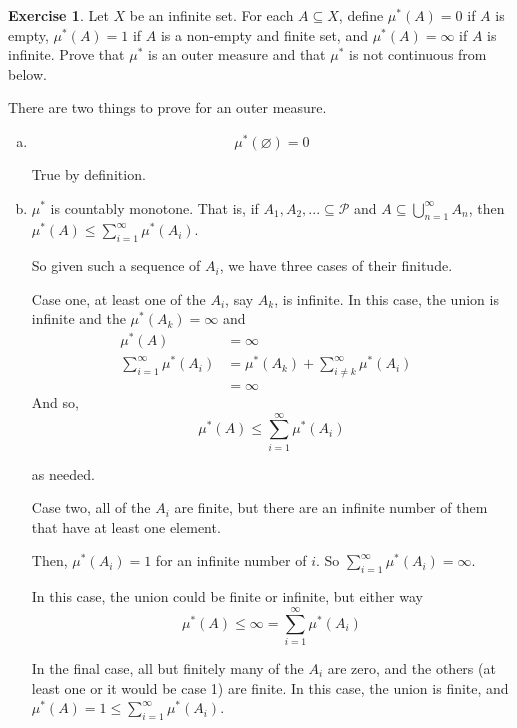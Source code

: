 \documentclass[11pt,oneside]{article}
\numberwithin{equation}{section}
\theoremstyle{definition}
\newtheorem{exercise}{Exercise}
\begin{document}
\begin{exercise}
  Let $X$ be an infinite set.  For each $A \subseteq X$,
  define $\mu^* (A) = 0$ if $A$ is empty, $\mu^*(A) = 1$ if
  $A$ is a non-empty and finite set, and $\mu^*(A) = \infty$
  if $A$ is infinite.  Prove that $\mu^*$ is an
  outer measure and that $\mu^*$ is not continuous from below.
\end{exercise}
\begin{solution}
  There are two things to prove for an outer measure.
  \begin{enumerate}[(a)]
    \item
      $$
      \mu ^ *(\varnothing) = 0
      $$

    True by definition.
    \item
      $      \mu ^ * $ is countably monotone.  That is, if $A_1, A_2, ... \subseteq \mathscr{P}$ and
      $A \subseteq \bigcup \limits _ {n=1} ^ {\infty} A_n$, then
      $\mu ^ * (A) \leq \sum \limits _ {i=1} ^ {\infty} \mu ^* ( A_i)$.

      So given such a sequence of $A_i$, we have three cases of their finitude.

      Case one, at least one of the $A_i$, say $A_k$, is infinite.  In this case,
      the union is infinite and the $\mu ^ * (A_k) = \infty$ and
      \begin{align*}
        \mu ^ * (A) &= \infty  & \\
        \sum \limits _ {i=1} ^ {\infty} \mu ^* ( A_i) &= \mu ^* (A_k) + \sum _{i\neq k} ^ \infty \mu ^*  (A_i) & \\ 
        & = \infty  & 
      \end{align*}
      And so,
      $$
      \mu ^ * (A) \leq   \sum \limits _ {i=1} ^ {\infty} \mu ^* ( A_i)  
      $$

      as needed.

      Case two, all of the $A_i$ are finite, but there are an infinite
      number of them that have at least one element.

      Then, $\mu ^*(A_i) = 1$ for an infinite number of $i$.  So
      $   \sum \limits _ {i=1} ^ {\infty} \mu ^* ( A_i) = \infty $. 

      In this case, the union could be finite or infinite, but either way 
      $$
      \mu^* (A) \leq \infty =  \sum \limits _ {i=1} ^ {\infty} \mu ^* ( A_i) 
      $$

      In the final case, all but finitely many of the $A_i$ are zero,
      and the others (at least one or it would be case 1) are finite.
      In this case, the union is finite, and $\mu^* (A) = 1 \leq \sum
      \limits _ {i=1} ^ {\infty} \mu ^* ( A_i)$.


\end{enumerate}
\end{solution}
\end{document}
